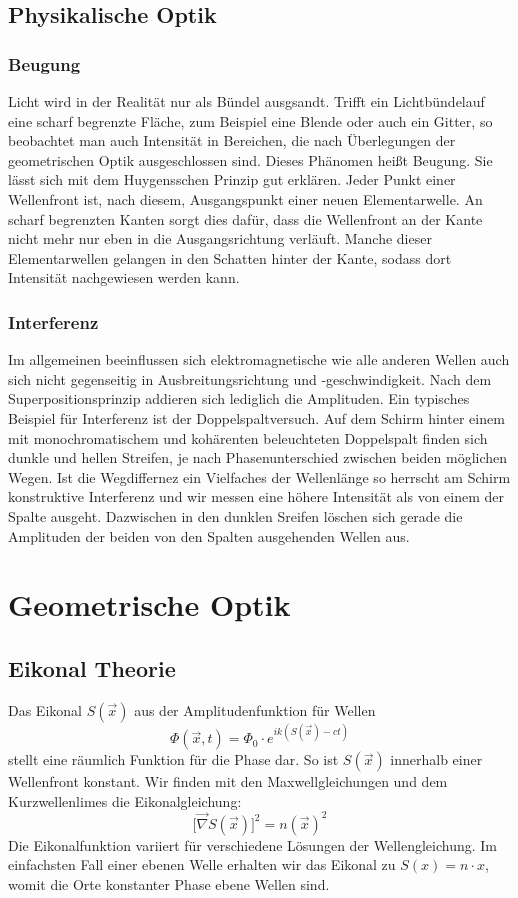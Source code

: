 \documentclass[twoside,colorback,accentcolor=tud4c,11pt]{tudreport}
\begin{document}
\subsection{Physikalische Optik}
		\subsubsection{Beugung}
			Licht wird in der Realität nur als Bündel ausgsandt. Trifft ein Lichtbündelauf eine scharf begrenzte Fläche, zum Beispiel eine Blende oder auch ein Gitter, so beobachtet man auch Intensität in Bereichen, die nach Überlegungen der geometrischen Optik ausgeschlossen sind. Dieses Phänomen heißt Beugung. Sie lässt sich mit dem Huygensschen Prinzip gut erklären. Jeder Punkt einer Wellenfront ist, nach diesem, Ausgangspunkt einer neuen Elementarwelle. An scharf begrenzten Kanten sorgt dies dafür, dass die Wellenfront an der Kante nicht mehr nur eben in die Ausgangsrichtung verläuft. Manche dieser Elementarwellen gelangen in den Schatten hinter der Kante, sodass dort Intensität nachgewiesen werden kann.
			\subsubsection{Interferenz}
			Im allgemeinen beeinflussen sich elektromagnetische wie alle anderen Wellen auch sich nicht gegenseitig in Ausbreitungsrichtung und -geschwindigkeit. Nach dem Superpositionsprinzip addieren sich lediglich die Amplituden. Ein typisches Beispiel für Interferenz ist der Doppelspaltversuch. Auf dem Schirm hinter einem mit monochromatischem und kohärenten beleuchteten Doppelspalt finden sich dunkle und hellen Streifen, je nach Phasenunterschied zwischen beiden möglichen Wegen. Ist die Wegdiffernez ein Vielfaches der Wellenlänge so herrscht am Schirm konstruktive Interferenz und wir messen eine höhere Intensität als von einem der Spalte ausgeht. Dazwischen in den dunklen Sreifen löschen sich gerade die Amplituden der beiden von den Spalten ausgehenden Wellen aus.
\section{Geometrische Optik}
\subsection{Eikonal Theorie}
		Das Eikonal $S \left( \vec{x} \right)$ aus der Amplitudenfunktion für Wellen 
		\[
		\Phi \left( \vec{x} , t \right) = \Phi_0 \cdot e^{ik\left(S \left( \vec{x} \right)-ct\right)}
		\]
		stellt eine räumlich Funktion für die Phase dar. So ist $S\left( \vec{x} \right)$ innerhalb einer Wellenfront konstant. Wir finden mit den Maxwellgleichungen und dem Kurzwellenlimes die Eikonalgleichung:
		\[
		\lbrack \vec{\nabla} S\left( \vec{x} \right) \rbrack ^2 = n\left(\vec{x} \right)^2
		\]
		Die Eikonalfunktion variiert für verschiedene Lösungen der Wellengleichung. Im einfachsten Fall einer ebenen Welle erhalten wir das Eikonal zu $S\left(x\right)= n\cdot x$, womit die Orte konstanter Phase ebene Wellen sind.
		
\end{document}
